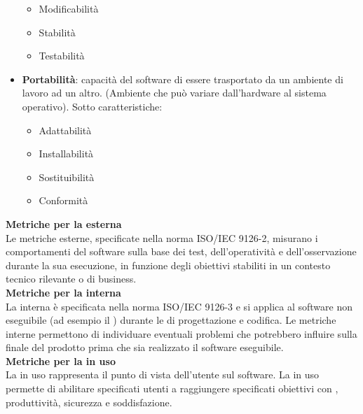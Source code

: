 \begin{itemize}
\begin{itemize}
\item Modificabilità
\item Stabilità
\item Testabilità
\end{itemize}
\item \textbf{Portabilità}: capacità del software di essere trasportato da un ambiente di lavoro ad un altro. (Ambiente che può variare dall'hardware al sistema operativo).
Sotto caratteristiche:
\begin{itemize}
\item Adattabilità
\item Installabilità
\item Sostituibilità
\item Conformità
\end{itemize}
\end{itemize}
\textbf{Metriche per la  esterna}\\
Le metriche esterne, specificate nella norma ISO/IEC 9126-2, misurano i comportamenti del software sulla base dei test, dell'operatività e dell'osservazione durante la sua esecuzione, in funzione degli obiettivi stabiliti in un contesto tecnico rilevante o di business.\\
\textbf{Metriche per la  interna}\\
La  interna è specificata nella norma ISO/IEC 9126-3 e si applica al software non eseguibile (ad esempio il ) durante le  di progettazione e codifica. 
Le metriche interne permettono di individuare eventuali problemi che potrebbero influire sulla  finale del prodotto prima che sia realizzato il software eseguibile.\\
\textbf{Metriche per la  in uso}\\
La  in uso rappresenta il punto di vista dell'utente sul software. La  in uso permette di abilitare specificati utenti a raggiungere specificati obiettivi con , produttività, sicurezza e soddisfazione.
